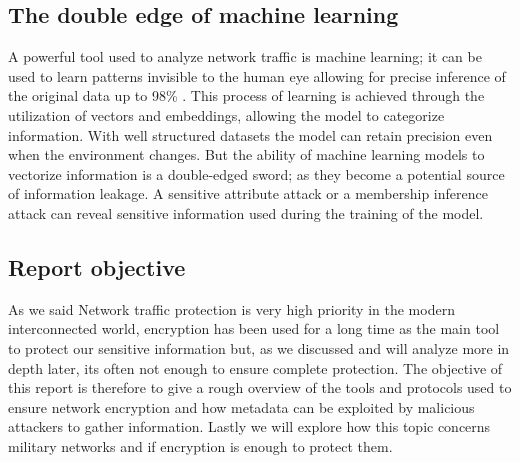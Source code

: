 \subsection{The double edge of machine learning}
A powerful tool used to analyze network traffic is machine learning;
it can be used to learn patterns invisible to the human eye allowing for precise inference of the original data up to 98\% \cite{grimaudo2013select}. 
This process of learning is achieved through the utilization of vectors and embeddings, allowing the model to categorize information. 
With well structured datasets the model can retain precision even when the environment changes. 
But the ability of machine learning models to vectorize information is a double-edged sword;
as they become a potential source of information leakage. 
A sensitive attribute attack or a membership inference attack can reveal sensitive information used during the training of the model. 

\subsection{Report objective}
As we said Network traffic protection is very high priority in the modern interconnected world, encryption has been used for a long time as the main tool to protect our sensitive information but, as we discussed and will analyze more in depth later, its often not enough to ensure complete protection.
The objective of this report is therefore to give a rough overview of the tools and protocols used to ensure network encryption and how metadata can be exploited by malicious attackers to gather information.
Lastly we will explore how this topic concerns military networks and if encryption is enough to protect them. 
